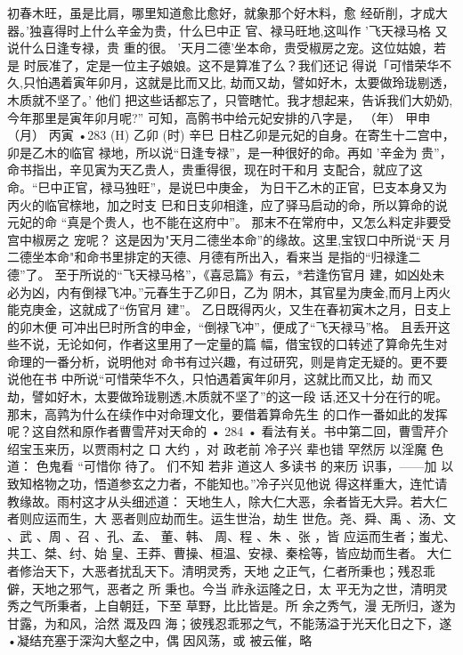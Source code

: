 初春木旺，虽是比肩，哪里知道愈比愈好，就象那个好木料，愈
经斫削，才成大器。'独喜得时上什么辛金为贵，什么巳中正
官、禄马旺地,这叫作 '飞天禄马格 又说什么日逢专禄，贵
重的很。 '天月二德'坐本命，贵受椒房之宠。这位姑娘，若是
时辰准了，定是一位主子娘娘。这不是算准了么？我们还记
得说「可惜荣华不久,只怕遇着寅年卯月，这就是比而又比,
劫而又劫，譬如好木，太要做玲珑剔透，木质就不坚了。' 他们
把这些话都忘了，只管瞎忙。我才想起来，告诉我们大奶奶,
今年那里是寅年卯月呢?”
可知，高鹘书中给元妃安排的八字是，
（年） 甲申
（月） 丙寅
•283 
(H) 乙卯
(时) 辛巳
日柱乙卯是元妃的自身。在寄生十二宫中，卯是乙木的临官
禄地，所以说“日逢专禄”，是一种很好的命。再如 '辛金为
贵”，命书指出，辛见寅为天乙贵人，贵重得很，现在时干和月
支配合，就应了这命。“巳中正官，禄马独旺”，是说巳中庚金，
为日干乙木的正官，巳支本身又为丙火的临官榇地，加之时支
巳和日支卯相逢，应了驿马启动的命，所以算命的说元妃的命
“真是个贵人，也不能在这府中”。
那末不在常府中，又怎么料定非要受宫中椒房之 宠呢？
这是因为"天月二德坐本命”的缘故。这里,宝钗口中所说“天
月二德坐本命"和命书里排定的天德、月德有所出入，看来当
是指的“归禄逢二德”了。
至于所说的“飞天禄马格”，《喜忌篇》有云，*若逢伤官月
建，如凶处未必为凶，内有倒禄飞冲。”元春生于乙卯日，乙为
阴木，其官星为庚金,而月上丙火能克庚金，这就成了“伤官月
建”。 乙日既得丙火，又生在春初寅木之月，日支上的卯木便
可冲出巳时所含的申金，“倒禄飞冲”，便成了“飞天禄马”格。
且丢开这些不说，无论如何，作者这里用了一定量的篇
幅，借宝钗的口转述了算命先生对命理的一番分析，说明他对
命书有过兴趣，有过研究，则是肯定无疑的。更不要说他在书
中所说“可惜荣华不久，只怕遇着寅年卯月，这就比而又比，劫
而又劫，譬如好木，太要做玲珑剔透,木质就不坚了”的这一段
话,还又十分在行的呢。
那末，高鹑为什么在续作中对命理文化，要借着算命先生
的口作一番如此的发挥呢？这自然和原作者曹雪芹对天命的
• 284 •
看法有关。书中第二回，曹雪芹介绍宝玉来历，以贾雨村之
口
大约
，对
政老前
冷子兴
辈也错
罕然厉
以淫魔
色道：
色鬼看
“可惜你
待了。
们不知
若非
道这人
多读书
的来历
识事，——加
以致知格物之功，悟道参玄之力者，不能知也。”冷子兴见他说
得这样重大，连忙请教缘故。雨村这才从头细述道：
天地生人，除大仁大恶，余者皆无大异。若大仁
者则应运而生，大 恶者则应劫而生。运生世治，劫生
世危。尧、舜、禹 、汤、文 、武 、周 、召 、孔、孟、 董、韩、
周、程 、朱 、张 ，皆 应运而生者；蚩尤、共工、桀、纣、始
皇、王莽、曹操、桓温、安禄、秦桧等，皆应劫而生者。
大仁者修治天下，大恶者扰乱天下。清明灵秀，天地
之正气，仁者所秉也；残忍乖僻，天地之邪气，恶者之
所 秉也。今当 祚永运隆之日，太 平无为之世，清明灵
秀之气所秉者，上自朝廷，下至 草野，比比皆是。所
余之秀气，漫 无所归，遂为 甘露，为和风，洽然 溉及四
海；彼残忍乖邪之气，不能荡溢于光天化日之下，遂
•凝结充塞于深沟大壑之中，偶 因风荡，或 被云催，略

